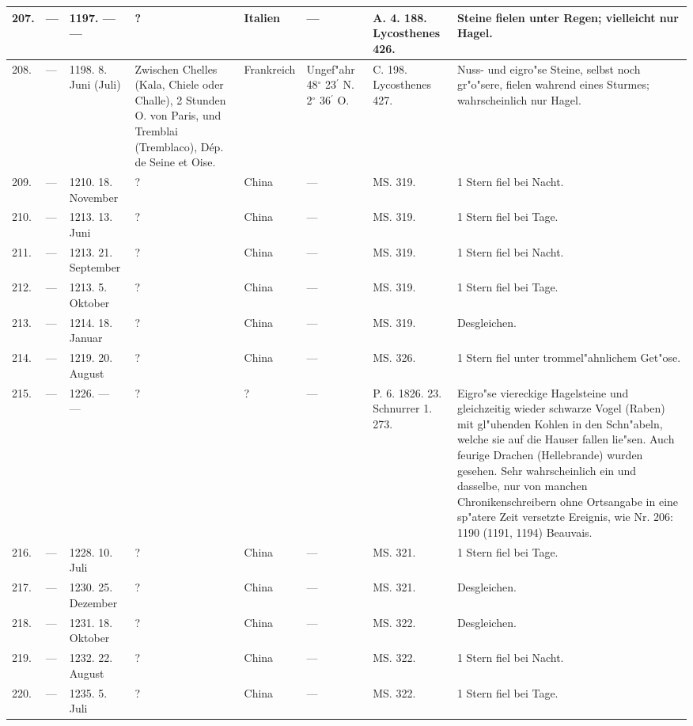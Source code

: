 \documentclass[a4paper, 8pt, oneside, polutonikogreek, german]{article}
\begin{document}
\begin{center}
\begin{longtable}{| p{5mm} | p{3mm} | p{15mm} | p{25mm} | p{20mm} | p{14mm} | p{17mm} | p{24mm} |}
        207. & --- & 1197. --- --- & ? & Italien & --- & A. 4. 188. Lycosthenes 426. & Steine fielen unter Regen; vielleicht nur Hagel. \\ \hline
        208. & --- & 1198. 8. Juni (Juli) & Zwischen Chelles (Kala, Chiele oder Challe), 2 Stunden O. von Paris, und Tremblai (Tremblaco), Dép. de Seine et Oise. & Frankreich & Ungef"ahr 48$^\circ$ 23$^\prime$ N. 2$^\circ$ 36$^\prime$ O. & C. 198. Lycosthenes 427. & Nuss- und eigro"se Steine, selbst noch gr"o"sere, fielen wahrend eines Sturmes; wahrscheinlich nur Hagel. \\ \hline
        209. & --- & 1210. 18. November & ? & China & --- & MS. 319. & 1 Stern fiel bei Nacht. \\ \hline
        210. & --- & 1213. 13. Juni & ? & China & --- & MS. 319. & 1 Stern fiel bei Tage. \\ \hline
        211. & --- & 1213. 21. September & ? & China & --- & MS. 319. & 1 Stern fiel bei Nacht. \\ \hline
        212. & --- & 1213. 5. Oktober & ? & China & --- & MS. 319. & 1 Stern fiel bei Tage. \\ \hline
        213. & --- & 1214. 18. Januar & ? & China & --- & MS. 319. & Desgleichen. \\ \hline
        214. & --- & 1219. 20. August & ? & China & --- & MS. 326. & 1 Stern fiel unter trommel"ahnlichem Get"ose. \\ \hline
        215. & --- & 1226. --- --- & ? & ? & --- & P. 6. 1826. 23. Schnurrer 1. 273. & Eigro"se viereckige Hagelsteine und gleichzeitig wieder schwarze Vogel (Raben) mit gl"uhenden Kohlen in den Schn"abeln, welche sie auf die Hauser fallen lie"sen. Auch feurige Drachen (Hellebrande) wurden gesehen. Sehr wahrscheinlich ein und dasselbe, nur von manchen Chronikenschreibern ohne Ortsangabe in eine sp"atere Zeit versetzte Ereignis, wie Nr. 206: 1190 (1191, 1194) Beauvais. \\ \hline
        216. & --- & 1228. 10. Juli & ? & China & --- & MS. 321. & 1 Stern fiel bei Tage. \\ \hline
        217. & --- & 1230. 25. Dezember & ? & China & --- & MS. 321. & Desgleichen. \\ \hline
        218. & --- & 1231. 18. Oktober & ? & China & --- & MS. 322. & Desgleichen. \\ \hline
        219. & --- & 1232. 22. August & ? & China & --- & MS. 322. & 1 Stern fiel bei Nacht. \\ \hline
        220. & --- & 1235. 5. Juli & ? & China & --- & MS. 322. & 1 Stern fiel bei Tage. \\ \hline

\end{longtable}
\end{center}
\end{document}
